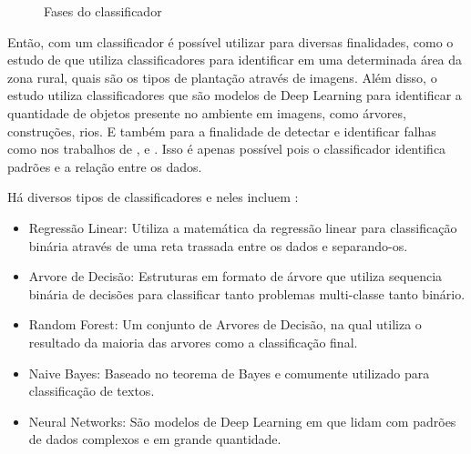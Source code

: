 \begin{figure}
  \centering
  \caption{Fases do classificador}
  \label{fig-workflow}
\end{figure}

Então, com um classificador é possível utilizar para diversas finalidades, como o estudo de \cite{pal2005random} que utiliza classificadores para identificar em uma determinada área da zona rural, quais são os tipos de plantação através de imagens. Além disso, o estudo \cite{zhang2018hybrid} utiliza classificadores que são modelos de Deep Learning para identificar a quantidade de objetos presente no ambiente em imagens, como árvores, construções, rios. E também para a finalidade de detectar e identificar falhas como nos trabalhos de \cite{wang2016wind}, \cite{neupane2020bearing} e \cite{saufi2019challenges}. Isso é apenas possível pois o classificador identifica padrões e a relação entre os dados.

Há diversos tipos de classificadores e neles incluem \cite{ayodele2010types}:

\begin{itemize}
  \item Regressão Linear: Utiliza a matemática da regressão linear para classificação binária através de uma reta trassada entre os dados e separando-os.
  \item Arvore de Decisão: Estruturas em formato de árvore que utiliza sequencia binária de decisões para classificar tanto problemas multi-classe tanto binário.
  \item Random Forest: Um conjunto de Arvores de Decisão, na qual utiliza o resultado da maioria das arvores como a classificação final.
  \item Naive Bayes: Baseado no teorema de Bayes e comumente utilizado para classificação de textos.
  \item Neural Networks: São modelos de Deep Learning em que lidam com padrões de dados complexos e em grande quantidade.
\end{itemize}

